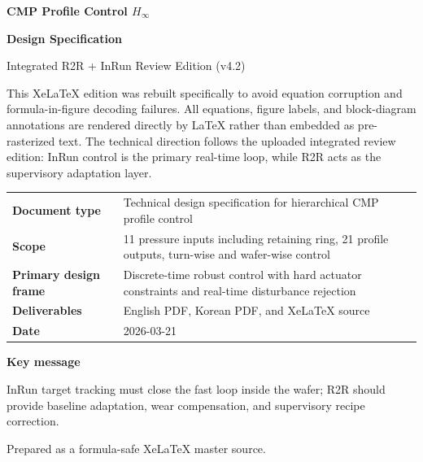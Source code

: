 \documentclass[11pt,a4paper]{article}
\begin{document}
\begin{titlepage}
\pagecolor{white}

\vspace*{2.0cm}
{\fontsize{24}{30}\selectfont\bfseries\color{TitleBlue} CMP Profile Control $H_{\infty}$\par}
\vspace{0.2cm}
{\fontsize{22}{28}\selectfont\bfseries\color{TitleBlue} Design Specification\par}
\vspace{0.5cm}
{\fontsize{15}{20}\selectfont\color{AccentTeal} Integrated R2R + InRun Review Edition (v4.2)\par}

\vspace{1.0cm}
\begin{tcolorbox}[colback=white,colframe=TitleBlue,boxrule=0.8pt,arc=2mm]
\small
This XeLaTeX edition was rebuilt specifically to avoid equation corruption and formula-in-figure decoding failures. All equations, figure labels, and block-diagram annotations are rendered directly by LaTeX rather than embedded as pre-rasterized text. The technical direction follows the uploaded integrated review edition: InRun control is the primary real-time loop, while R2R acts as the supervisory adaptation layer.
\end{tcolorbox}

\vspace{0.8cm}
\begin{tabularx}{\textwidth}{>{\bfseries}p{3.3cm}X}
Document type & Technical design specification for hierarchical CMP profile control \\
Scope & 11 pressure inputs including retaining ring, 21 profile outputs, turn-wise and wafer-wise control \\
Primary design frame & Discrete-time robust control with hard actuator constraints and real-time disturbance rejection \\
Deliverables & English PDF, Korean PDF, and XeLaTeX source \\
Date & 2026-03-21 \\
\end{tabularx}

\vfill
{\large\bfseries\color{TitleBlue} Key message}\par
\vspace{0.2cm}
{\large InRun target tracking must close the fast loop inside the wafer; R2R should provide baseline adaptation, wear compensation, and supervisory recipe correction.}\par

\vspace{1.0cm}
{\color{gray}Prepared as a formula-safe XeLaTeX master source.}
\end{titlepage}
\end{document}
